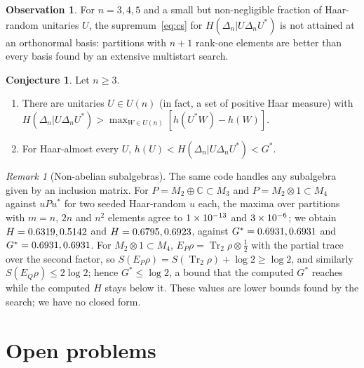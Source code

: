 \documentclass[11pt]{article}
\DeclareMathOperator{\Tr}{Tr}
\newcommand{\C}{\mathbb{C}}
\theoremstyle{plain}
\theoremstyle{definition}
\newtheorem{conjecture}[theorem]{Conjecture}
\newtheorem{observation}[theorem]{Observation}
\theoremstyle{remark}
\newtheorem{remark}[theorem]{Remark}
\begin{document}
\begin{observation}\label{obs:bases}
For $n=3,4,5$ and a small but non-negligible fraction of Haar-random unitaries $U$, the supremum~\eqref{eq:cs} for
$H(\Delta_n|U\Delta_nU^*)$ is not attained at an orthonormal basis: partitions with $n+1$ rank-one elements are better than
every basis found by an extensive multistart search.
\end{observation}

\begin{conjecture}\label{conj:n3}
Let $n\ge3$.
\begin{enumerate}
\item[(a)] There are unitaries $U\in U(n)$ (in fact, a set of positive Haar measure) with
$H(\Delta_n|U\Delta_nU^*)>\max_{W\in U(n)}[h(U^*W)-h(W)]$.
\item[(b)] For Haar-almost every $U$, $h(U)<H(\Delta_n|U\Delta_nU^*)<G^*$.
\end{enumerate}
\end{conjecture}

\begin{remark}[Non-abelian subalgebras]\label{rem:nonab}
The same code handles any subalgebra given by an inclusion matrix. For $P=M_2\oplus\C\subset M_3$ and $P=M_2\otimes1\subset M_4$
against $uPu^*$ for two seeded Haar-random $u$ each, the maxima over partitions with $m=n$, $2n$ and $n^2$ elements agree to
$1\times10^{-13}$ and $3\times10^{-6}$; we obtain $H=0.6319, 0.5142$ and $H=0.6795, 0.6923$, against $G^*=0.6931, 0.6931$ and
$G^*=0.6931, 0.6931$. For $M_2\otimes1\subset M_4$, $E_P\rho=\Tr_2\rho\otimes\frac12$ with the partial trace over the second factor, so
$S(E_P\rho)=S(\Tr_2\rho)+\log2\ge\log2$, and similarly $S(E_Q\rho)\le2\log2$; hence $G^*\le\log2$, a bound that the computed $G^*$
reaches while the computed $H$ stays below it. These values are lower bounds found by the search; we have no closed form.
\end{remark}

\section{Open problems}\label{sec:open}
\end{document}
